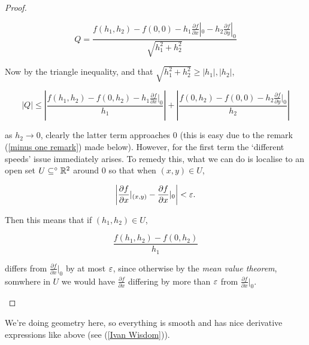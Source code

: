\documentclass[11pt]{scrartcl}
\begin{document}
\begin{theorem}
\begin{proof}
\begin{example}
                \begin{equation}
                    Q = \frac{f(h_1, h_2) - f(0, 0) - h_1 \frac{\partial f}{\partial x}|_0 - h_2 \frac{\partial f}{\partial y}|_0}{\sqrt{h_1^2 + h_2^2}}
                    \label{Q equation}
                \end{equation}

                Now by the triangle inequality, and that $\sqrt{h_1^2 + h_2^2} \ge |h_1|, |h_2|$,

                \begin{equation}
                    |Q| \le \left| \frac{f(h_1,h_2) - f(0, h_2) - h_1 \frac{\partial f}{\partial x}|_0}{h_1} \right| + \left| \frac{f(0,h_2) - f(0, 0) - h_2 \frac{\partial f}{\partial y}|_0}{h_2} \right|
                \end{equation}

                as $h_2 \to 0$, clearly the latter term approaches 0 (this is easy due to the remark (\ref{minus one remark}) made below). However, for the first term the `different speeds' issue immediately arises. To remedy this, what we can do is localise to an open set $U \subseteq^\circ \mathbb R^2$ around 0 so that when $(x,y) \in U$,

                \begin{equation}
                    \left| \frac{\partial f}{\partial x}|_{(x,y)} - \frac{\partial f}{\partial x}|_0 \right| < \varepsilon.
                \end{equation}

                Then this means that if $(h_1, h_2) \in U$,

                \begin{equation}
                    \frac{f(h_1, h_2) - f(0, h_2)}{h_1}
                \end{equation}

                differs from $\frac{\partial f}{\partial x}|_0$ by at most $\varepsilon$, since otherwise by the \emph{mean value theorem}, somwhere in $U$ we would have $\frac{\partial f}{\partial x}$ differing by more than $\varepsilon$ from $\frac{\partial f}{\partial x}|_0$.

            \end{example}
        \end{proof}
    \label{extracting derivatives}
\end{theorem}

We're doing geometry here, so everything is smooth and has nice derivative expressions like above (see (\ref{Ivan Wisdom})).
\end{document}
